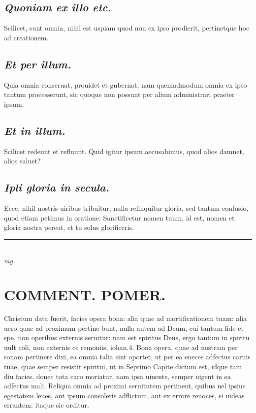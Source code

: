 \documentclass{article}
\begin{document}
\begin{pages}
\subsection*{\textit{Quoniam ex illo etc. }}\pstart Scilicet, sunt omnia, nihil est uspiam quod non ex ipso prodierit, pertinetque hoc ad creationem.   \pend
{}
{}
\subsection*{\textit{Et per illum. }}\pstart Quia omnia conseruat, prouidet et gubernat, nam quemadmodum omnia ex ipso tantum processerunt, sic quoque non possunt per alium administrari praeter ipsum.   \pend
{}
{}
\subsection*{\textit{Et in illum. }}\pstart Scilicet redeunt et refluunt. Quid igitur ipsum aecusabimus, quod alios damnet, alios saluet?  \pend
{}
{}
\subsection*{\textit{Ipli gloria in secula. }}\pstart Ecce, nihil nostris uiribus tribuitur, nulla relinquitur gloria, sed tantum confusio, quod etiam petimus in oratione: Sanctificetur nomen tuum, id est, nomen et gloria nostra pereat, et tu solus glorificeris.   \pend
\marginpar{[ p.]}\pstart  \pend
\vspace{0.5cm}\noindent
\vspace{0.2cm}\rule{1cm}{0.2pt}\\ 
\hspace{0.2cm}\textit{mg}
\footnotesize 
\normalsize| 
\section*{COMMENT. POMER.  }\pstart Christum data fuerit, facies opera bona: alia quae ad mortificationem tuam: alia uero quae ad proximum pertine bunt, nulla autem ad Deum, cui tantum fide et spe, non operibus externis seruitur: nam est spiritus Deus, ergo tantum in spiritu uult coli, non externis ce remoniis, iohan.4. Bona opera, quae ad nostram per sonam pertinere dixi, ea omnia talia sint oportet, ut per ea eneces adfectus carnis tuae, quae semper resistit spiritui, ut in Septimo Capite dictum est, idque tam diu facies, donec tota caro moriatur, nam ipsa uiuente, semper uigent in ea adfectus mali. Reliqua omnia ad proximi seruitutem pertinent, quibus uel ipsius egestatem leues, aut ipsum consoleris adflictum, aut ex errore reuoces, si uideas errantem: itaque sic orditur.  \pend
{}
{}

\end{pages}
\end{document}
